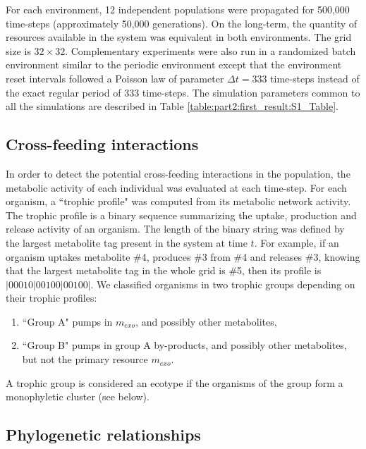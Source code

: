 For each environment, 12 independent populations were propagated for 500,000 time-steps (approximately 50,000 generations). On the long-term, the quantity of resources available in the system was equivalent in both environments. The grid size is $32 \times 32$. Complementary experiments were also run in a randomized batch environment similar to the periodic environment except that the environment reset intervals followed a Poisson law of parameter $\Delta t = 333$ time-steps instead of the exact regular period of 333 time-steps. The simulation parameters common to all the simulations are described in Table \ref{table:part2:first_result:S1_Table}.


\subsection{Cross-feeding interactions}

In order to detect the potential cross-feeding interactions in the population, the metabolic activity of each individual was evaluated at each time-step. For each organism, a ``trophic profile" was computed from its metabolic network activity. The trophic profile is a binary sequence summarizing the uptake, production and release activity of an organism. The length of the binary string was defined by the largest metabolite tag present in the system at time $t$. For example, if an organism uptakes metabolite \#4, produces \#3 from \#4 and releases \#3, knowing that the largest metabolite tag in the whole grid is \#5, then its profile is $|00010|00100|00100|$.
We classified organisms in two trophic groups depending on their trophic profiles:
\begin{enumerate}
\item ``Group A" pumps in $m_{exo}$, and possibly other metabolites,
\item ``Group B" pumps in group A by-products, and possibly other metabolites, but not the primary resource $m_{exo}$.
\end{enumerate}
A trophic group is considered an ecotype if the organisms of the group form a monophyletic cluster (see below).


\subsection{Phylogenetic relationships}

